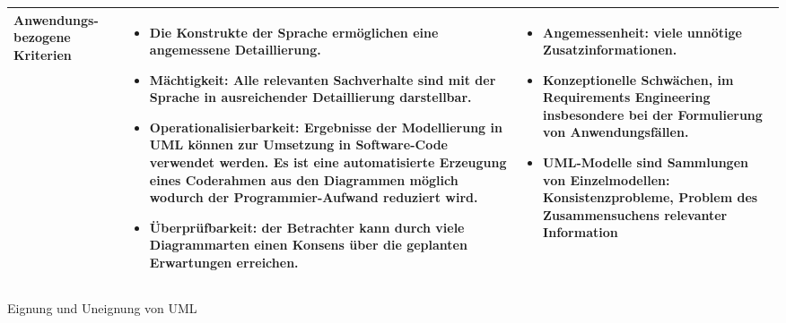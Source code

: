 	\begin{tabularx}{\textwidth}{|p{2cm}|X|X|}
		\hline
		Anwendungs- bezogene	Kriterien &
		\begin{itemize}
			\item Die Konstrukte der Sprache ermöglichen eine angemessene Detaillierung.
			\item Mächtigkeit: Alle relevanten Sachverhalte sind mit der
			Sprache in ausreichender Detaillierung darstellbar.
			 
			\item Operationalisierbarkeit: Ergebnisse der Modellierung in UML können zur Umsetzung in Software-Code verwendet werden. Es ist eine automatisierte Erzeugung eines Coderahmen aus den Diagrammen möglich wodurch der Programmier-Aufwand reduziert wird.
			\item Überprüfbarkeit:  der Betrachter kann durch viele Diagrammarten einen Konsens über die geplanten Erwartungen erreichen.
		\end{itemize}  & 
		\begin{itemize}
			\item Angemessenheit: viele unnötige Zusatzinformationen.
			\item Konzeptionelle Schwächen, im Requirements Engineering insbesondere bei der Formulierung von Anwendungsfällen.
			\item UML-Modelle sind Sammlungen von Einzelmodellen: Konsistenzprobleme, Problem des Zusammensuchens relevanter Information
		\end{itemize} \\
		\hline
	\end{tabularx} 
	\caption{Eignung und Uneignung von UML}
		
